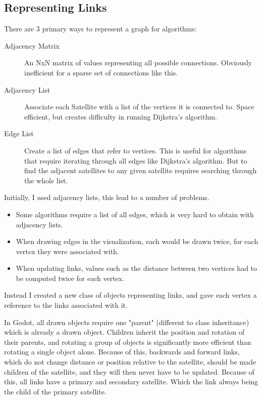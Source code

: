 \documentclass[12pt]{report}
\begin{document}
\subsection{Representing Links}
There are 3 primary ways to represent a graph for algorithms:

\begin{description}
\item[Adjacency Matrix] An NxN matrix of values representing all possible connections. Obviously inefficient for a sparse set of connections like this.
\item[Adjacency List] Associate each Satellite with a list of the vertices it is connected to. Space efficient, but creates difficulty in running Dijkstra's algorithm.
\item[Edge List] Create a list of edges that refer to vertices. This is useful for algorithms that require iterating through all edges like Dijkstra's algorithm. But to find the adjacent satellites to any given satellite requires searching through the whole list.
\end{description}

Initially, I used adjacency lists, this lead to a number of problems.

\begin{itemize}
\item Some algorithms require a list of all edges, which is very hard to obtain with adjacency lists.
\item When drawing edges in the visualization, each would be drawn twice, for each vertex they were associated with.
\item When updating links, values such as the distance between two vertices had to be computed twice for each vertex.
\end{itemize}

Instead I created a new class of objects representing links, and gave each vertex a reference to the links associated with it. 

In Godot, all drawn objects require one "parent" (different to class inheritance) which is already a drawn object. Children inherit the position and rotation of their parents, and rotating a group of objects is significantly more efficient than rotating a single object alone. Because of this, backwards and forward links, which do not change distance or position relative to the satellite, should be made children of the satellite, and they will then never have to be updated. Because of this, all links have a primary and secondary satellite. Which the link always being the child of the primary satellite.
\end{document}
